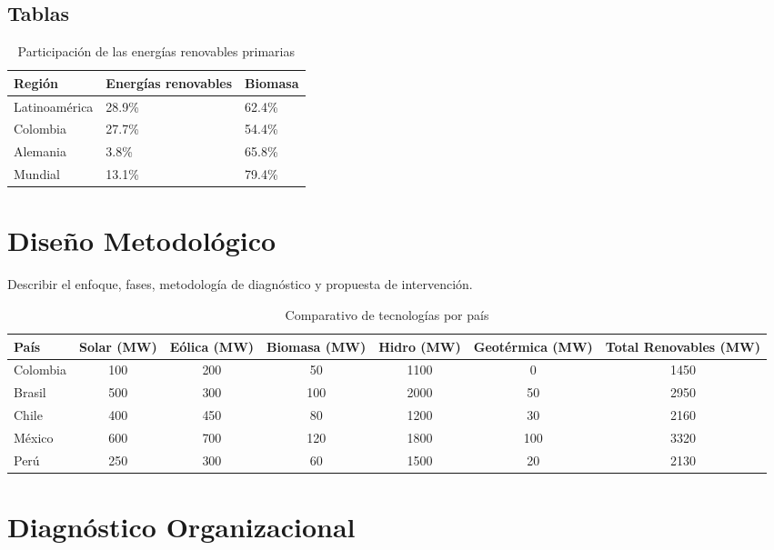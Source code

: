 \documentclass[12pt]{article}
\newcommand{\chapterbreak}{\clearpage \thispagestyle{fancy}}
\begin{document}
\subsection*{Tablas}
\begin{table}[H]
\centering
\caption{Participaci\'on de las energías renovables primarias}
\begin{tabular}{|l|l|l|}
\hline
Región & Energías renovables & Biomasa \\
\hline
Latinoam\'erica & 28.9\% & 62.4\% \\
Colombia & 27.7\% & 54.4\% \\
Alemania & 3.8\% & 65.8\% \\
Mundial & 13.1\% & 79.4\% \\
\hline
\end{tabular}
\end{table}

\chapterbreak

\section{Diseño Metodológico}
Describir el enfoque, fases, metodolog\'ia de diagn\'ostico \cite{gonzalezModeloAdministracionProyectos2012} y propuesta de intervenci\'on.

\chapterbreak

\clearpage
\thispagestyle{empty}
\begin{landscape}
\begin{table}[H]
\centering
\caption{Comparativo de tecnologías por país}
\begin{tabular}{|l|c|c|c|c|c|c|}
\hline
País & Solar (MW) & Eólica (MW) & Biomasa (MW) & Hidro (MW) & Geotérmica (MW) & Total Renovables (MW) \\
\hline
Colombia & 100 & 200 & 50 & 1100 & 0 & 1450 \\
Brasil & 500 & 300 & 100 & 2000 & 50 & 2950 \\
Chile & 400 & 450 & 80 & 1200 & 30 & 2160 \\
México & 600 & 700 & 120 & 1800 & 100 & 3320 \\
Perú & 250 & 300 & 60 & 1500 & 20 & 2130 \\
\hline
\end{tabular}
\end{table}
\end{landscape}
\chapterbreak

\section{Diagn\'ostico Organizacional}
\end{document}
